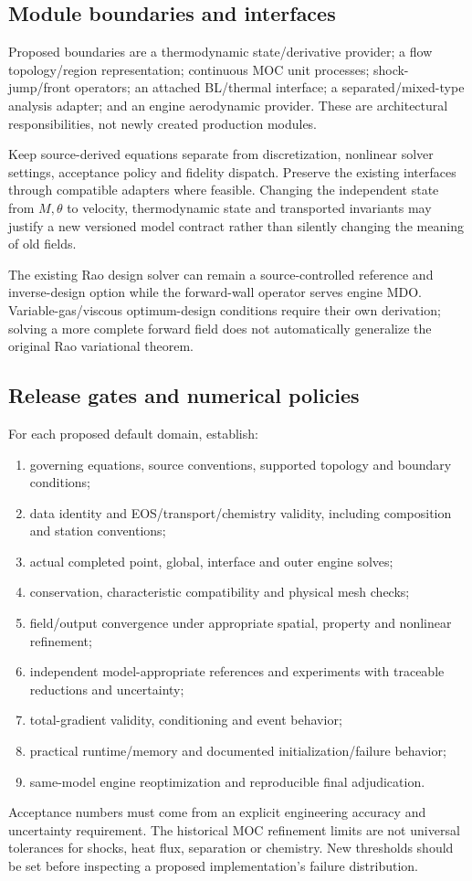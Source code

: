 \subsection{Module boundaries and interfaces}
Proposed boundaries are a thermodynamic state/derivative provider; a
flow topology/region representation; continuous MOC unit processes;
shock-jump/front operators; an attached BL/thermal interface; a
separated/mixed-type analysis adapter; and an engine aerodynamic
provider. These are architectural responsibilities, not newly created
production modules.

Keep source-derived equations separate from discretization, nonlinear
solver settings, acceptance policy and fidelity dispatch. Preserve the
existing interfaces through compatible adapters where feasible.
Changing the independent state from \(M,\theta\) to velocity,
thermodynamic state and transported invariants may justify a new versioned
model contract rather than silently changing the meaning of old fields.

The existing Rao design solver can remain a source-controlled reference
and inverse-design option while the forward-wall operator serves engine
MDO. Variable-gas/viscous optimum-design conditions require their own
derivation; solving a more complete forward field does not automatically
generalize the original Rao variational theorem.

\subsection{Release gates and numerical policies}
For each proposed default domain, establish:
\begin{enumerate}
\item governing equations, source conventions, supported topology and
boundary conditions;
\item data identity and EOS/transport/chemistry validity, including
composition and station conventions;
\item actual completed point, global, interface and outer engine solves;
\item conservation, characteristic compatibility and physical mesh checks;
\item field/output convergence under appropriate spatial, property and
nonlinear refinement;
\item independent model-appropriate references and experiments with
traceable reductions and uncertainty;
\item total-gradient validity, conditioning and event behavior;
\item practical runtime/memory and documented initialization/failure behavior;
\item same-model engine reoptimization and reproducible final adjudication.
\end{enumerate}
Acceptance numbers must come from an explicit engineering accuracy and
uncertainty requirement. The historical MOC refinement limits are not
universal tolerances for shocks, heat flux, separation or chemistry.
New thresholds should be set before inspecting a proposed implementation's
failure distribution.

